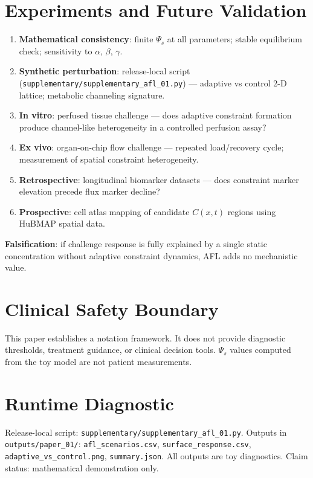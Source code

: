 \documentclass[11pt]{article}
\begin{document}
\section{Experiments and Future Validation}

\begin{enumerate}
    \item \textbf{Mathematical consistency}: finite $\Psi_s$ at all parameters; stable equilibrium check; sensitivity to $\alpha$, $\beta$, $\gamma$.
    \item \textbf{Synthetic perturbation}: release-local script (\texttt{supplementary/supplementary\_afl\_01.py}) — adaptive vs control 2-D lattice; metabolic channeling signature.
    \item \textbf{In vitro}: perfused tissue challenge — does adaptive constraint formation produce channel-like heterogeneity in a controlled perfusion assay?
    \item \textbf{Ex vivo}: organ-on-chip flow challenge — repeated load/recovery cycle; measurement of spatial constraint heterogeneity.
    \item \textbf{Retrospective}: longitudinal biomarker datasets — does constraint marker elevation precede flux marker decline?
    \item \textbf{Prospective}: cell atlas mapping of candidate $C(x,t)$ regions using HuBMAP spatial data.
\end{enumerate}

\textbf{Falsification}: if challenge response is fully explained by a single static concentration without adaptive constraint dynamics, AFL adds no mechanistic value.

\section{Clinical Safety Boundary}

This paper establishes a notation framework. It does not provide diagnostic thresholds, treatment guidance, or clinical decision tools. $\Psi_s$ values computed from the toy model are not patient measurements.

\section{Runtime Diagnostic}

Release-local script: \texttt{supplementary/supplementary\_afl\_01.py}. Outputs in \texttt{outputs/paper\_01/}: \texttt{afl\_scenarios.csv}, \texttt{surface\_response.csv}, \texttt{adaptive\_vs\_control.png}, \texttt{summary.json}. All outputs are toy diagnostics. Claim status: mathematical demonstration only.
\end{document}
